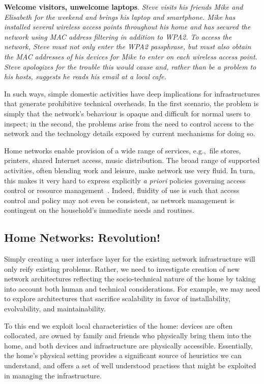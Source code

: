 \textbf{Welcome visitors, unwelcome laptops}.  {\it Steve visits his friends
  Mike and Elisabeth for the weekend and brings his laptop and smartphone.  Mike
  has installed several wireless access points throughout his home and has
  secured the network using MAC address filtering in addition to WPA2.  To
  access the network, Steve must not only enter the WPA2 passphrase, but must
  also obtain the MAC addresses of his devices for Mike to enter on each
  wireless access point.  Steve apologizes for the trouble this would cause and,
  rather than be a problem to his hosts, suggests he reads his email at a local
  cafe.} 

In such ways, simple domestic activities have deep implications for
infrastructures that generate prohibitive technical overheads.  In the first
scenario, the problem is simply that the network's behaviour is opaque and
difficult for normal users to inspect; in the second, the problems arise from
the need to control access to the network and the technology details exposed by
current mechanisms for doing so.  

Home networks enable provision of a wide range of services, e.g.,~file stores,
printers, shared Internet access, music distribution.  The broad range of
supported activities, often blending work and leisure, make network use very
fluid.  In turn, this makes it very hard to express explicitly \emph{a priori}
policies governing access control or resource management~\cite{tolmie07:_makin}.
Indeed, fluidity of use is such that access control and policy may not even be
consistent, as network management is contingent on the household's immediate
needs and routines.

\subsection{Home Networks: Revolution!} \label{s:revolution}

Simply creating a user interface layer for the existing network infrastructure
will only reify existing problems.  Rather, we need to investigate creation of
new network architectures reflecting the socio-technical nature of the home by
taking into account both human and technical considerations.  For example, we
may need to explore architectures that sacrifice scalability in favor of
installability, evolvability, and maintainability.  

To this end we exploit local characteristics of the home: devices are often
collocated, are owned by family and friends who physically bring them into the
home, and both devices and infrastructure are physically accessible.
Essentially, the home's physical setting provides a significant source of
heuristics we can understand, and offers a set of well understood practises that
might be exploited in managing the infrastructure.  

